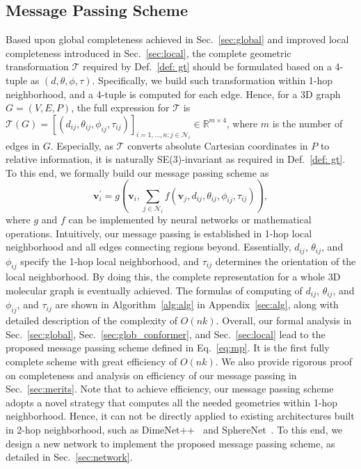 \documentclass{article}
\begin{document}
\subsection{Message Passing Scheme} \label{sec:mp}
Based upon global completeness achieved in Sec.~\ref{sec:global}
and improved local completeness introduced in Sec.~\ref{sec:local},
the complete geometric transformation $\mathcal{T}$ required by
Def.~\ref{def: gt} should be formulated based on a 4-tuple as 
$(d,\theta,\phi, \tau)$.
Specifically, we build such transformation within 1-hop neighborhood,
and a 4-tuple is computed for each edge.
Hence, for a 3D graph $G=(V,E,P)$,
the full expression for $\mathcal{T}$ is
$\mathcal{T}(G)=[(d_{ij},\theta_{ij},\phi_{ij}, \tau_{ij})]_{i=1,...,n; j\in \mathcal{N}_i} \in \mathbb{R}^{m\times 4}$,
where $m$ is the number of edges in $G$.
Especially, as $\mathcal{T}$ converts absolute Cartesian coordinates in $P$
to relative information, it is naturally SE(3)-invariant
as required in Def.~\ref{def: gt}.
To this end, we formally build our message passing scheme as
\begin{equation}
    \textbf{v}^{\prime}_i = g\left(\textbf{v}_i, \sum_{j\in\mathcal{N}_i}f\left(\textbf{v}_j, d_{ij}, \theta_{ij}, \phi_{ij}, \tau_{ij}\right)\right),
    \label{eq:mp}
\end{equation}
where $g$ and $f$ can be implemented by neural networks or mathematical operations.
Intuitively, our message passing is established in 1-hop local neighborhood and all edges connecting regions beyond.
Essentially, $d_{ij}$, $\theta_{ij}$, and $\phi_{ij}$
specify the 1-hop local neighborhood, and
$\tau_{ij}$ determines the orientation of the 
local neighborhood. By doing this, the complete representation 
for a whole 3D molecular graph is eventually achieved.
The formulas of computing of $d_{ij}$, $\theta_{ij}$, and $\phi_{ij}$, and $\tau_{ij}$
are shown in Algorithm~\ref{alg:alg} in Appendix~\ref{sec:alg},
along with detailed description of the
complexity of $O(nk)$.
\textcolor{COLOR}{
Overall, our formal analysis in Sec.~\ref{sec:global}, Sec.~\ref{sec:glob_conformer}, and Sec.~\ref{sec:local}
lead to the proposed message passing scheme defined in Eq.~\ref{eq:mp}.
It is the first fully complete scheme with great efficiency of $O(nk)$.
We also provide rigorous proof on completeness and analysis on efficiency of our message passing in Sec.~\ref{sec:merits}.
Note that to achieve efficiency, our message passing scheme adopts a novel strategy that computes all the needed geometries within 1-hop neighborhood.
Hence, it can not be directly applied to existing architectures built in 2-hop neighborhood, such as DimeNet++~\cite{klicpera_dimenetpp_2020} and SphereNet~\cite{liu2022spherical}.
To this end, we design a new network to implement the proposed message passing scheme, as detailed in Sec.~\ref{sec:network}.
}
\end{document}
